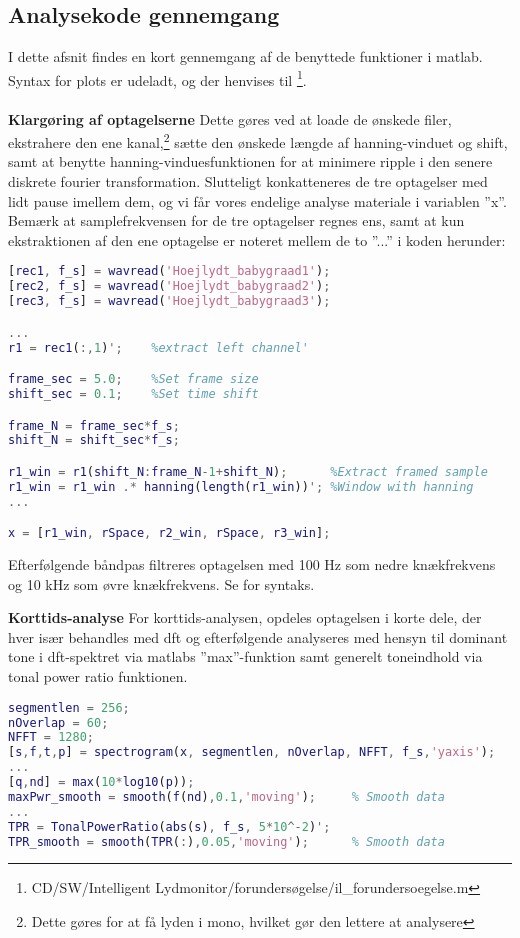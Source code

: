 \subsection*{Analysekode gennemgang}
I dette afsnit findes en kort gennemgang af de benyttede funktioner i matlab. Syntax for plots er udeladt, og der henvises til \citep{cd}\footnote{CD/SW/Intelligent Lydmonitor/forundersøgelse/il\_forundersoegelse.m}. \\
\\
\textbf{Klargøring af optagelserne}
Dette gøres ved at loade de ønskede filer, ekstrahere den ene kanal,\footnote{Dette gøres for at få lyden i mono, hvilket gør den lettere at analysere} sætte den ønskede længde af hanning-vinduet og shift, samt at benytte hanning-vinduesfunktionen for at minimere ripple i den senere diskrete fourier transformation. Slutteligt konkatteneres de tre optagelser med lidt pause imellem dem, og vi får vores endelige analyse materiale i variablen ''x''. Bemærk at samplefrekvensen for de tre optagelser regnes ens, samt at kun ekstraktionen af den ene optagelse er noteret mellem de to ''...'' i koden herunder:
\begin{lstlisting}[language=Matlab]
%**** EXTRACT SAMPLES *********************************************%
[rec1, f_s] = wavread('Hoejlydt_babygraad1');
[rec2, f_s] = wavread('Hoejlydt_babygraad2');
[rec3, f_s] = wavread('Hoejlydt_babygraad3');

...
r1 = rec1(:,1)';    %extract left channel'

frame_sec = 5.0;    %Set frame size
shift_sec = 0.1;    %Set time shift

frame_N = frame_sec*f_s;
shift_N = shift_sec*f_s;

r1_win = r1(shift_N:frame_N-1+shift_N);      %Extract framed sample
r1_win = r1_win .* hanning(length(r1_win))'; %Window with hanning
...

x = [r1_win, rSpace, r2_win, rSpace, r3_win];
\end{lstlisting}

Efterfølgende båndpas filtreres optagelsen med 100 Hz som nedre knækfrekvens og 10 kHz som øvre knækfrekvens. Se \citep[SW/Intelligent Lydmonitor/forundersøgelse/il\_forundersoegelse.m]{cd} for syntaks.

\textbf{Korttids-analyse}
For korttids-analysen, opdeles optagelsen i korte dele, der hver især behandles med dft og efterfølgende analyseres med hensyn til dominant tone i dft-spektret via matlabs ''max''-funktion samt generelt toneindhold via tonal power ratio funktionen.
\begin{lstlisting}[language=Matlab]
%**** SHORT-TIME DFT (Spectogram) *********************************%
segmentlen = 256;
nOverlap = 60;
NFFT = 1280;
[s,f,t,p] = spectrogram(x, segmentlen, nOverlap, NFFT, f_s,'yaxis'); 
...
[q,nd] = max(10*log10(p)); 
maxPwr_smooth = smooth(f(nd),0.1,'moving');     % Smooth data
...
TPR = TonalPowerRatio(abs(s), f_s, 5*10^-2)';
TPR_smooth = smooth(TPR(:),0.05,'moving');      % Smooth data
\end{lstlisting}

